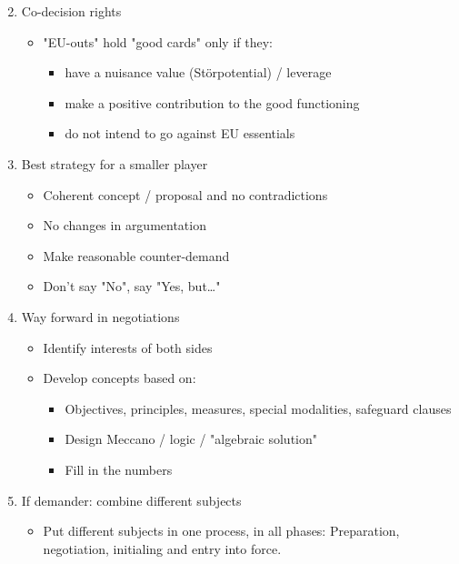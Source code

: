 \begin{enumerate}
    \setcounter{enumi}{1}
    \item Co-decision rights
        \begin{itemize}
            \item "EU-outs" hold "good cards" only if they:
                \begin{itemize}
                    \item have a nuisance value (Störpotential) / leverage
                    \item make a positive contribution to the good functioning
                    \item do not intend to go against EU essentials
                \end{itemize}
        \end{itemize}
    \item Best strategy for a smaller player
        \begin{itemize}
            \item Coherent concept / proposal and no contradictions
            \item No changes in argumentation
            \item Make reasonable counter-demand
            \item Don't say "No", say "Yes, but\dots"
        \end{itemize}
    \item Way forward in negotiations
        \begin{itemize}
            \item Identify interests of both sides
            \item Develop concepts based on:
                \begin{itemize}
                    \item Objectives, principles, measures, special modalities,
                        safeguard clauses
                    \item Design Meccano / logic / "algebraic solution"
                    \item Fill in the numbers
                \end{itemize}
        \end{itemize}
    \item If demander: combine different subjects
        \begin{itemize}
            \item Put different subjects in one process, in all phases:
                Preparation, negotiation, initialing and entry into force.
        \end{itemize}
\end{enumerate}
